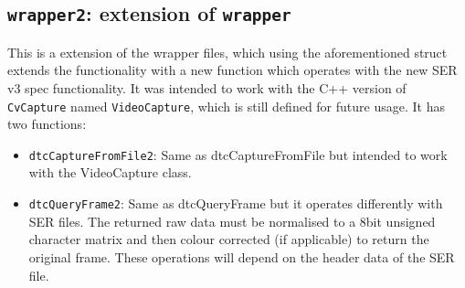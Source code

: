 \documentclass[a4paper,11pt]{memoir}
\begin{document}
\subsection{\texttt{wrapper2}: extension of \texttt{wrapper}}

This is a extension of the wrapper files, which using the aforementioned struct extends the
functionality with a new function which operates with the new SER v3 spec functionality.
It was intended to work with the C++ version of \texttt{CvCapture} named \texttt{VideoCapture}, which is
still defined for future usage. It has two functions:

\begin{itemize}
\item \texttt{dtcCaptureFromFile2}: Same as dtcCaptureFromFile but intended to work with
the VideoCapture class.
\item \texttt{dtcQueryFrame2}: Same as dtcQueryFrame but it operates differently with SER
files. The returned raw data must be normalised to a 8bit unsigned character matrix
and then colour corrected (if applicable) to return the original frame. These operations
will depend on the header data of the SER file.
\end{itemize}

\backmatter
\end{document}
